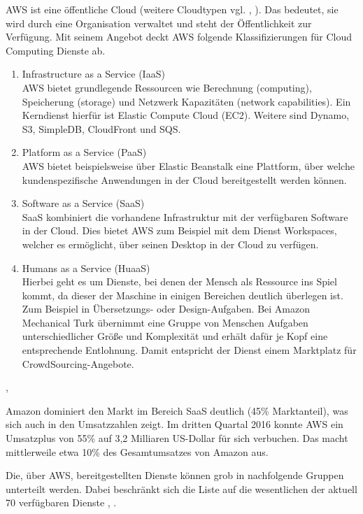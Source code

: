 {AWS ist eine öffentliche Cloud (weitere Cloudtypen vgl. \cite{wittig:awsinaction}, \cite{baun:cloudcomp}). Das bedeutet, sie wird durch eine Organisation verwaltet und steht der Öffentlichkeit zur Verfügung. Mit seinem Angebot deckt AWS folgende Klassifizierungen für Cloud Computing Dienste ab.
\begin{enumerate}
  \item Infrastructure as a Service (IaaS)
  \\AWS bietet grundlegende Ressourcen wie Berechnung (computing), Speicherung (storage) und Netzwerk Kapazitäten (network capabilities). Ein Kerndienst hierfür ist Elastic Compute Cloud (EC2). Weitere sind Dynamo, S3, SimpleDB, CloudFront und SQS.
  \item Platform as a Service (PaaS)
  \\AWS bietet beispielsweise über Elastic Beanstalk eine Plattform, über welche kundenspezifische Anwendungen in der Cloud bereitgestellt werden können.
  \item Software as a Service (SaaS)
  \\SaaS kombiniert die vorhandene Infrastruktur mit der verfügbaren Software in der Cloud. Dies bietet AWS zum Beispiel mit dem Dienst Workspaces, welcher es ermöglicht, über seinen Desktop in der Cloud zu verfügen.
  \item Humans as a Service (HuaaS)
  \\ Hierbei geht es um Dienste, bei denen der Mensch als Ressource ins Spiel kommt, da dieser der Maschine in einigen Bereichen deutlich überlegen ist. Zum Beispiel in Übersetzungs- oder Design-Aufgaben. Bei Amazon Mechanical Turk übernimmt eine Gruppe von Menschen Aufgaben unterschiedlicher Größe und Komplexität und erhält dafür je Kopf eine entsprechende Entlohnung. Damit entspricht der Dienst einem Marktplatz für CrowdSourcing-Angebote.
\end{enumerate} \cite{wittig:awsinaction}, \cite{baun:cloudcomp}

Amazon dominiert den Markt im Bereich SaaS deutlich (45\% Marktanteil), was sich auch in den Umsatzzahlen zeigt. Im dritten Quartal 2016 konnte AWS ein Umsatzplus von 55\% auf 3,2 Milliaren US-Dollar für sich verbuchen. Das macht mittlerweile etwa 10\% des Gesamtumsatzes von Amazon aus. \cite{t3n:brien}

Die, über AWS, bereitgestellten Dienste können grob in nachfolgende Gruppen unterteilt werden. Dabei beschränkt sich die Liste auf die wesentlichen der aktuell 70 verfügbaren Dienste \cite{sendcheckit:plain}, \cite{aws:insider}.

}

